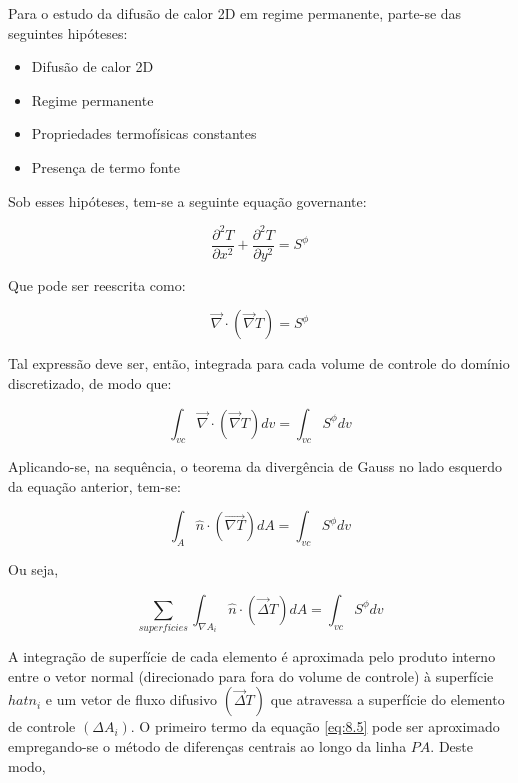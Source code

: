 Para o estudo da difusão de calor 2D em regime permanente, parte-se das seguintes hipóteses:
\begin{itemize}
    \item Difusão de calor 2D
    \item Regime permanente
    \item Propriedades termofísicas constantes
    \item Presença de termo fonte
\end{itemize}

Sob esses hipóteses, tem-se a seguinte equação governante:

\begin{equation}
    \label{eq:8.1}
    \frac{\partial^2 T}{\partial x^2} + \frac{\partial^2 T}{\partial y^2} = S^\phi
\end{equation}

Que pode ser reescrita como:

\begin{equation}
    \label{eq:8.2}
    \vec{\nabla} \cdot (\vec{\nabla} T) = S^\phi
\end{equation}

Tal expressão deve ser, então, integrada para cada volume de controle do domínio discretizado, de modo que:

\begin{equation}
    \label{eq:8.3}
    \int_{vc} \vec{\nabla} \cdot (\vec{\nabla}T) dv = \int_{vc}S^\phi dv
\end{equation}

Aplicando-se, na sequência, o teorema da divergência de Gauss no lado esquerdo da equação anterior, tem-se:

\begin{equation}
    \label{eq:8.4}
    \int_A \hat{n} \cdot (\vec{\nabla T}) dA = \int_{vc} S^\phi dv
\end{equation}

Ou seja,

\begin{equation}
    \label{eq:8.5}
    \sum_{superficies} \int_{\nabla A_i} \hat{n} \cdot (\vec{\Delta}T)dA = \int_{vc} S^\phi dv
\end{equation}

A integração de superfície de cada elemento é aproximada pelo produto interno entre o vetor normal (direcionado para fora do volume de controle) à superfície $
hat{n_i}$ e um vetor de fluxo difusivo $(\vec{\Delta}T)$ que atravessa a superfície do elemento de controle $(\Delta A_i)$. O primeiro termo da equação \ref{eq:8.5} pode ser aproximado empregando-se o método de diferenças centrais ao longo da linha $PA$. Deste modo,


